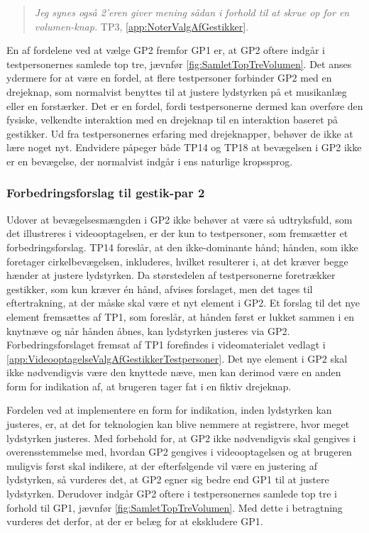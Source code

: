% 
%
\begin{quotation}
	\noindent
	\textit{Jeg synes også 2'eren giver mening sådan i forhold til at skrue op for en volumen-knap.} TP3, \autoref{app:NoterValgAfGestikker}.
\noindent
\end{quotation}
%
En af fordelene ved at vælge GP2 fremfor GP1 er, at GP2 oftere indgår i testpersonernes samlede top tre, jævnfør \autoref{fig:SamletTopTreVolumen}. Det anses ydermere for at være en fordel, at flere testpersoner forbinder GP2 med en drejeknap, som normalvist benyttes til at justere lydstyrken på et musikanlæg eller en forstærker. Det er en fordel, fordi testpersonerne dermed kan overføre den fysiske, velkendte interaktion med en drejeknap til en interaktion baseret på gestikker. Ud fra testpersonernes erfaring med drejeknapper, behøver de ikke at lære noget nyt. Endvidere påpeger både TP14 og TP18 at bevægelsen i GP2 ikke er en bevægelse, der normalvist indgår i ens naturlige kropssprog. 
%
\subsubsection{Forbedringsforslag til gestik-par 2}
\label{TestresultaterValgAfGestikkerForbedringGP2Volumen}
%
Udover at bevægelsesmængden i GP2 ikke behøver at være så udtryksfuld, som det illustreres i videooptagelsen, er der kun to testpersoner, som fremsætter et forbedringsforslag. TP14 foreslår, at den ikke-dominante hånd; hånden, som ikke foretager cirkelbevægelsen, inkluderes, hvilket resulterer i, at det kræver begge hænder at justere lydstyrken. Da størstedelen af testpersonerne foretrækker gestikker, som kun kræver én hånd, afvises forslaget, men det tages til eftertrakning, at der måske skal være et nyt element i GP2. Et forslag til det nye element fremsættes af TP1, som foreslår, at hånden først er lukket sammen i en knytnæve og når hånden åbnes, kan lydstyrken justeres via GP2. Forbedringsforslaget fremsat af TP1 forefindes i videomaterialet vedlagt i \autoref{app:VideooptagelseValgAfGestikkerTestpersoner}. Det nye element i GP2 skal ikke nødvendigvis være den knyttede næve, men kan derimod være en anden form for indikation af, at brugeren tager fat i en fiktiv drejeknap. 

Fordelen ved at implementere en form for indikation, inden lydstyrken kan justeres, er, at det for teknologien kan blive nemmere at registrere, hvor meget lydstyrken justeres.\blankline
%    
Med forbehold for, at GP2 ikke nødvendigvis skal gengives i overensstemmelse med, hvordan GP2 gengives i videooptagelsen og at brugeren muligvis først skal indikere, at der efterfølgende vil være en justering af lydstyrken, så vurderes det, at GP2 egner sig bedre end GP1 til at justere lydstyrken. Derudover indgår GP2 oftere i testpersonernes samlede top tre i forhold til GP1, jævnfør \autoref{fig:SamletTopTreVolumen}. Med dette i betragtning vurderes det derfor, at der er belæg for at ekskludere GP1. 
%
